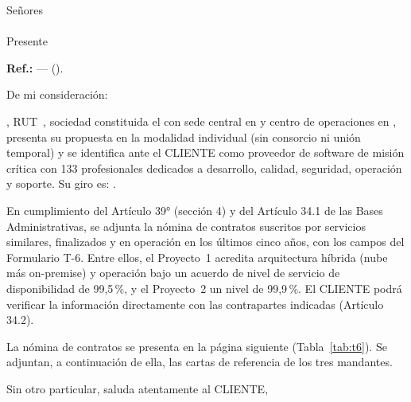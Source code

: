 \documentclass[carta,final]{lafrox}
\begin{document}

\noindent\SIMfecha\par\medskip
\noindent Señores\\
\textbf{\LFXcliente}\\
Presente\par\medskip
\noindent\textbf{Ref.:} \LFXlicitacion{} --- \LFXobjeto{} (\LFXcaso).\par\medskip

De mi consideración:\par\smallskip

\LFXempresa, RUT~\LFXrut, sociedad constituida el \SIMconstitucion{} con sede central en \SIMsedecentral{} y centro de operaciones en \LFXdomicilio, presenta su propuesta en la modalidad individual (sin consorcio ni unión temporal) y se identifica ante el CLIENTE como proveedor de software de misión crítica con 133 profesionales dedicados a desarrollo, calidad, seguridad, operación y soporte. Su giro es: \SIMgiro.

En cumplimiento del Artículo 39° (sección 4) y del Artículo 34.1 de las Bases Administrativas, se adjunta la nómina de contratos suscritos por servicios similares, finalizados y en operación en los últimos cinco años, con los campos del Formulario T-6. Entre ellos, el Proyecto~1 acredita arquitectura híbrida (nube más on-premise) y operación bajo un acuerdo de nivel de servicio de disponibilidad de 99,5\,\%, y el Proyecto~2 un nivel de 99,9\,\%. El CLIENTE podrá verificar la información directamente con las contrapartes indicadas (Artículo 34.2).

La nómina de contratos se presenta en la página siguiente (Tabla~\ref{tab:t6}). Se adjuntan, a continuación de ella, las cartas de referencia de los tres mandantes.

Sin otro particular, saluda atentamente al CLIENTE,

\SIMfirma{\SIMfecha}
\end{document}
